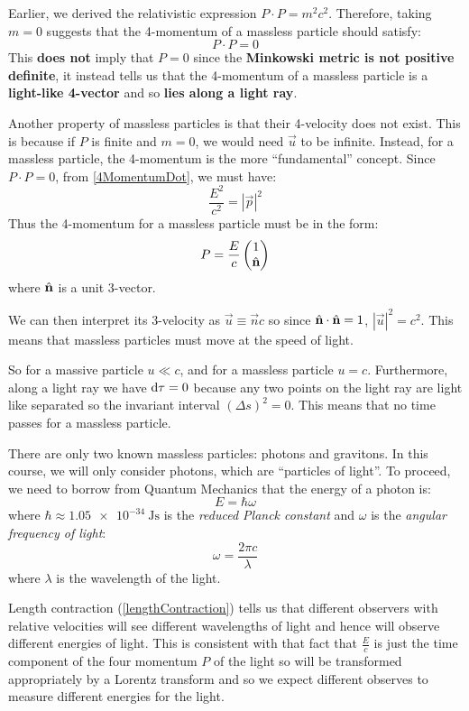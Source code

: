 \documentclass[../main.tex]{subfiles}
\begin{document}
Earlier, we derived the relativistic expression $P \cdot P = m^2 c^2$.
Therefore, taking $m = 0$ suggests that the 4-momentum of a massless particle should satisfy:
\[
  P \cdot P = 0
\]
This \textbf{does not} imply that $P = 0$ since the \textbf{Minkowski metric is not positive definite}, it instead tells us that the 4-momentum of a massless particle is a \textbf{light-like 4-vector} and so \textbf{lies along a light ray}.

Another property of massless particles is that their 4-velocity does not exist.
This is because if $P$ is finite and $m = 0$, we would need $\vec{u}$ to be infinite.
Instead, for a massless particle, the 4-momentum is the more ``fundamental'' concept.
Since $P \cdot P = 0$, from \cref{4MomentumDot}, we must have:
\[
  \frac{E^2}{c^2} = |\vec{p}|^2
\]
Thus the 4-momentum for a massless particle must be in the form:
\begin{equation}
  P = \frac{E}{c} \begin{pmatrix}
  1 \\
  \hat{\mathbf{\bm{n}}} \\
  \end{pmatrix} \label{massless4Momentum}
\end{equation}
where $\hat{\mathbf{\bm{n}}}$ is a unit 3-vector.

We can then interpret its 3-velocity as $\vec{u} \equiv \vec{n} c$ so since $\hat{\mathbf{\bm{n}}} \cdot \hat{\mathbf{\bm{n}}} = 1$, $|\vec{u}|^2 = c^2$.
This means that massless particles must move at the speed of light.

So for a massive particle $u \ll c$, and for a massless particle $u = c$.
Furthermore, along a light ray we have $\d{\tau} = 0$ because any two points on the light ray are light like separated so the invariant interval $(\Delta s)^2 = 0$.
This means that no time passes for a massless particle.

There are only two known massless particles: photons and gravitons.
In this course, we will only consider photons, which are ``particles of light''.
To proceed, we need to borrow from Quantum Mechanics that the energy of a photon is:
\[
  E = \hbar \omega
\]
where $\hbar \approx \qty{1.05e-34}{\joule\second}$ is the \textit{reduced Planck constant} and $\omega$ is the \textit{angular frequency of light}:
\[
  \omega = \frac{2\pi c}{\lambda}
\]
where $\lambda$ is the wavelength of the light.

Length contraction (\cref{lengthContraction}) tells us that different observers with relative velocities will see different wavelengths of light and hence will observe different energies of light.
This is consistent with that fact that $\frac{E}{c}$ is just the time component of the four momentum $P$ of the light so will be transformed appropriately by a Lorentz transform and so we expect different observes to measure different energies for the light.
\end{document}
